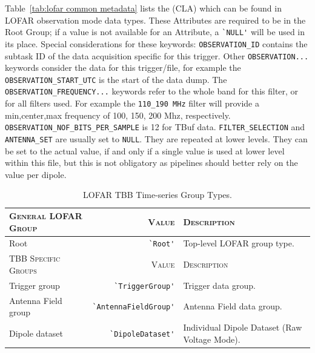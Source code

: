\documentclass[a4paper,10pt,bibtotoc]{scrartcl}
\begin{document}
Table~\ref{tab:lofar common metadata} lists the {\cla} (CLA) which can
be found in LOFAR observation mode data types. These Attributes are required to be in the Root
Group; if a value is not available for an Attribute, a \verb|`NULL'|
will be used in its place. Special considerations for these keywords: \texttt{OBSERVATION\_ID} contains the subtask ID of the data acquisition specific for this trigger. Other \texttt{OBSERVATION...} keywords consider the data for this trigger/file, for example the \texttt{OBSERVATION\_START\_UTC} is the start of the data dump. The \texttt{OBSERVATION\_FREQUENCY...} keywords refer to the whole band for this filter, or for all filters used. For example the \texttt{110\_190 MHz} filter will provide a min,center,max frequency of 100, 150, 200 Mhz, respectively. \texttt{OBSERVATION\_NOF\_BITS\_PER\_SAMPLE} is 12 for TBuf data. \texttt{FILTER\_SELECTION} and \texttt{ANTENNA\_SET} are usually set to \texttt{NULL}. They are repeated at lower levels. They can be set to the actual value, if and only if a single value is used at lower level within this file, but this is not obligatory as pipelines should better rely on the value per dipole.

\begin{table}[tbp]
  \centering
  \begin{tabular}{|lrp{6cm}|}
    \hline
    \textsc{General LOFAR Group} & \textsc{Value} & \textsc{Description} \\
    \hline
    Root          & \verb|`Root'|    & Top-level LOFAR group type.\\
    \hline
    \hline
    \textsc{TBB Specific Groups} & \textsc{Value} & \textsc{Description} \\
    \hline
    
    Trigger group & \verb|`TriggerGroup'| &  Trigger data group. \\
    Antenna Field group & \verb|`AntennaFieldGroup'|  & Antenna Field data group. \\
    Dipole dataset & \verb|`DipoleDataset'| & Individual Dipole Dataset (Raw Voltage Mode). \\
    \hline
  \end{tabular}
  \caption{LOFAR TBB Time-series Group Types.}
  \label{tab:group types}
\end{table}



\end{document}
